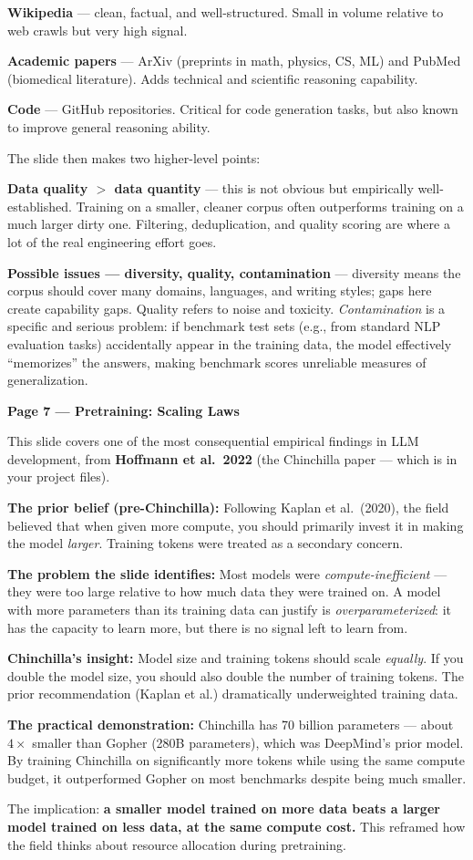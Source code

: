 \textbf{Wikipedia} --- clean, factual, and well-structured. Small in volume relative to web crawls but very high signal.

\textbf{Academic papers} --- ArXiv (preprints in math, physics, CS, ML) and PubMed (biomedical literature). Adds technical and scientific reasoning capability.

\textbf{Code} --- GitHub repositories. Critical for code generation tasks, but also known to improve general reasoning ability.

The slide then makes two higher-level points:

\textbf{Data quality $>$ data quantity} --- this is not obvious but empirically well-established. Training on a smaller, cleaner corpus often outperforms training on a much larger dirty one. Filtering, deduplication, and quality scoring are where a lot of the real engineering effort goes.

\textbf{Possible issues --- diversity, quality, contamination} --- diversity means the corpus should cover many domains, languages, and writing styles; gaps here create capability gaps. Quality refers to noise and toxicity. \textit{Contamination} is a specific and serious problem: if benchmark test sets (e.g., from standard NLP evaluation tasks) accidentally appear in the training data, the model effectively ``memorizes'' the answers, making benchmark scores unreliable measures of generalization.

\medskip

\textbf{Page 7 --- Pretraining: Scaling Laws}

This slide covers one of the most consequential empirical findings in LLM development, from \textbf{Hoffmann et al.\ 2022} (the Chinchilla paper --- which is in your project files).

\textbf{The prior belief (pre-Chinchilla):} Following Kaplan et al.\ (2020), the field believed that when given more compute, you should primarily invest it in making the model \textit{larger}. Training tokens were treated as a secondary concern.

\textbf{The problem the slide identifies:} Most models were \textit{compute-inefficient} --- they were too large relative to how much data they were trained on. A model with more parameters than its training data can justify is \textit{overparameterized}: it has the capacity to learn more, but there is no signal left to learn from.

\textbf{Chinchilla's insight:} Model size and training tokens should scale \textit{equally}. If you double the model size, you should also double the number of training tokens. The prior recommendation (Kaplan et al.) dramatically underweighted training data.

\textbf{The practical demonstration:} Chinchilla has 70 billion parameters --- about $4\times$ smaller than Gopher (280B parameters), which was DeepMind's prior model. By training Chinchilla on significantly more tokens while using the same compute budget, it outperformed Gopher on most benchmarks despite being much smaller.

The implication: \textbf{a smaller model trained on more data beats a larger model trained on less data, at the same compute cost.} This reframed how the field thinks about resource allocation during pretraining.